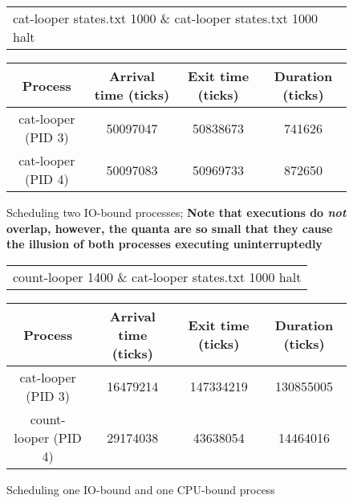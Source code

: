 \documentclass{article}
\newcommand{\command}[1]{{\sffamily#1}}
\begin{document}
\begin{landscape}
\begin{figure}
\centering

\begin{tabular}{l}
\command{cat-looper states.txt 1000 \&}
\command{cat-looper states.txt 1000}
\command{halt}
\end{tabular}

%

\vspace{1em}

\begin{tabular}{cccc}\toprule
Process & Arrival time (ticks) & Exit time (ticks) & Duration (ticks)\\\hline
\command{cat-looper} (PID 3) & \num{50097047} & \num{50838673} & \num{741626} \\\bottomrule
\command{cat-looper} (PID 4) & \num{50097083} & \num{50969733} & \num{872650} \\\bottomrule
\end{tabular}
\caption{Scheduling two IO-bound processes; \textbf{Note that executions do \emph{not} overlap,
however, the quanta are so small that they cause the illusion of both processes executing uninterruptedly}}
\label{fig:twoIoBound}
\end{figure}
\end{landscape}

\begin{figure}
\centering

\begin{tabular}{l}
\command{count-looper 1400 \&}
\command{cat-looper states.txt 1000}
\command{halt}
\end{tabular}

%

\vspace{1em}

\begin{tabular}{cccc}\toprule
Process & Arrival time (ticks) & Exit time (ticks) & Duration (ticks)\\\hline
\command{cat-looper} (PID 3) & \num{16479214} & \num{147334219} & \num{130855005} \\\bottomrule
\command{count-looper} (PID 4) & \num{29174038} & \num{43638054} & \num{14464016} \\\bottomrule
\end{tabular}
\caption{Scheduling one IO-bound and one CPU-bound process}
\label{fig:oneEach}
\end{figure}
\end{document}
